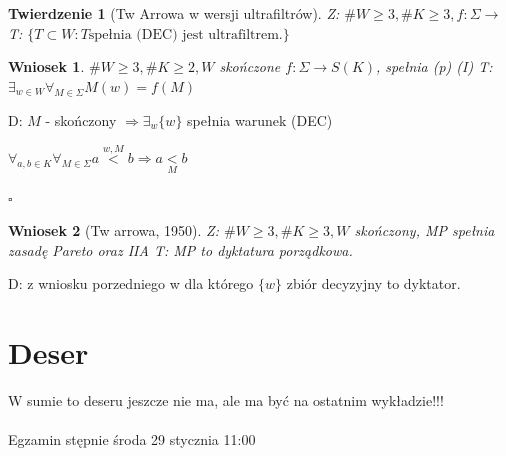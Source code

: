 \documentclass[12pt,a4paper]{article}
\theoremstyle{break}
\newtheorem{theorem}{Twierdzenie}[section]
\newtheorem{wniosek}{Wniosek}[theorem]
\begin{document}
	\begin{theorem}[Tw Arrowa w wersji ultrafiltrów]
		Z: $\# W\geq 3, \# K \geq 3, f:\Sigma \rightarrow$
		T: $\{T\subset W: T \text{spełnia (DEC) jest ultrafiltrem.}\}$
	\end{theorem}
	
	\begin{wniosek}
		$\# W \geq 3, \# K \geq 2, W$ skończone
		$f:\Sigma \rightarrow S(K)$, spełnia (p) (I)
		T: $\exists_{w\in W} \forall_{M\in \Sigma} M(w)=f(M)$
	\end{wniosek}
	D: $M$ - skończony $\Rightarrow \exists_w \{w\}$ spełnia warunek (DEC)
	
	$\forall_{a,b \in K} \forall_{M\in \Sigma} a\overset{w,M}{<}b\Rightarrow a\underset{M}{<}b$
	
	\begin{flushright}$\square$\end{flushright}
	
	\begin{wniosek}[Tw arrowa, 1950]
		Z: $\# W \geq 3, \# K \geq 3, W$ skończony,	MP spełnia zasadę Pareto oraz IIA
		T: MP to dyktatura porządkowa.
	\end{wniosek}
	
	D: z wniosku porzedniego
	w dla którego $\{w\}$ zbiór decyzyjny to dyktator.
	
	
	
	
	
	
	
	
	
	\newpage
	\section{Deser}
	\begin{center}
		{\fontsize{30}{36}\selectfont\faBirthdayCake}
	\end{center} 
	
	W sumie to deseru jeszcze nie ma, ale ma być na ostatnim wykładzie!!! \\\\
	Egzamin stępnie środa 29 stycznia 11:00
	
	
		
	
	

	
	
\end{document}

